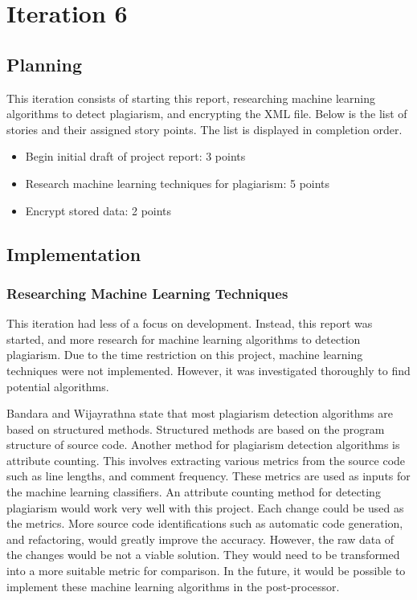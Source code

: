 \chapter{Iteration 6}
\section{Planning}
This iteration consists of starting this report, researching machine learning algorithms to detect plagiarism, and encrypting the XML file. Below is the list of stories and their assigned story points. The list is displayed in completion order.

\begin{itemize}
\item Begin initial draft of project report: 3 points
\item Research machine learning techniques for plagiarism: 5 points
\item Encrypt stored data: 2 points
\end{itemize}

\section{Implementation}
\subsection{Researching Machine Learning Techniques}
This iteration had less of a focus on development. Instead, this report was started, and more research for machine learning algorithms to detection plagiarism. Due to the time restriction on this project, machine learning techniques were not implemented. However, it was investigated thoroughly to find potential algorithms.

Bandara and Wijayrathna state that most plagiarism detection algorithms are based on structured methods\cite{Bandara2012}. Structured methods are based on the program structure of source code. Another method for plagiarism detection algorithms is attribute counting. This involves extracting various metrics from the source code such as line lengths, and comment frequency. These metrics are used as inputs for the machine learning classifiers. An attribute counting method for detecting plagiarism would work very well with this project. Each change could be used as the metrics. More source code identifications such as automatic code generation, and refactoring, would greatly improve the accuracy. However, the raw data of the changes would be not a viable solution. They would need to be transformed into a more suitable metric for comparison. In the future, it would be possible to implement these machine learning algorithms in the post-processor.

